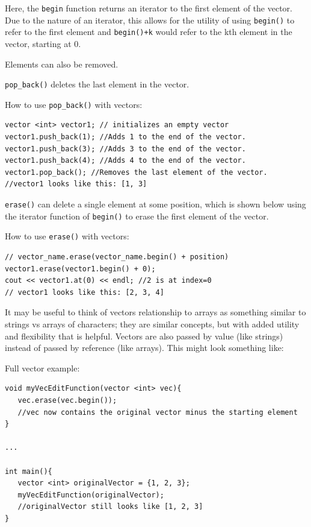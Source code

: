 Here, the \texttt{begin} function returns an iterator to the first element of the vector. Due to the nature of an iterator, this allows for the utility of using \texttt{begin()} to refer to the first element and \texttt{begin()+k} would refer to the kth element in the vector, starting at 0.

Elements can also be removed.

\texttt{pop_back()} deletes the last element in the vector.

\begin{example}
    How to use \texttt{pop_back()} with vectors:
    \begin{verbatim}
vector <int> vector1; // initializes an empty vector
vector1.push_back(1); //Adds 1 to the end of the vector. 
vector1.push_back(3); //Adds 3 to the end of the vector. 
vector1.push_back(4); //Adds 4 to the end of the vector. 
vector1.pop_back(); //Removes the last element of the vector.
//vector1 looks like this: [1, 3]
    \end{verbatim}
\end{example}

\texttt{erase()} can delete a single element at some position, which is shown below using the iterator function of \texttt{begin()} to erase the first element of the vector.

\begin{example}
    How to use \texttt{erase()} with vectors:

    \begin{verbatim}
// vector_name.erase(vector_name.begin() + position)
vector1.erase(vector1.begin() + 0);
cout << vector1.at(0) << endl; //2 is at index=0
// vector1 looks like this: [2, 3, 4]
    \end{verbatim}
\end{example}

It may be useful to think of vectors relationship to arrays as something similar to strings vs arrays of characters; they are similar concepts, but with added utility and flexibility that is helpful. Vectors are also passed by value (like strings) instead of passed by reference (like arrays). This might look something like:

\begin{example}
    Full vector example:

    \begin{verbatim}
void myVecEditFunction(vector <int> vec){
   vec.erase(vec.begin());
   //vec now contains the original vector minus the starting element
}

...

int main(){
   vector <int> originalVector = {1, 2, 3};
   myVecEditFunction(originalVector);
   //originalVector still looks like [1, 2, 3]
}
    \end{verbatim}
\end{example}

